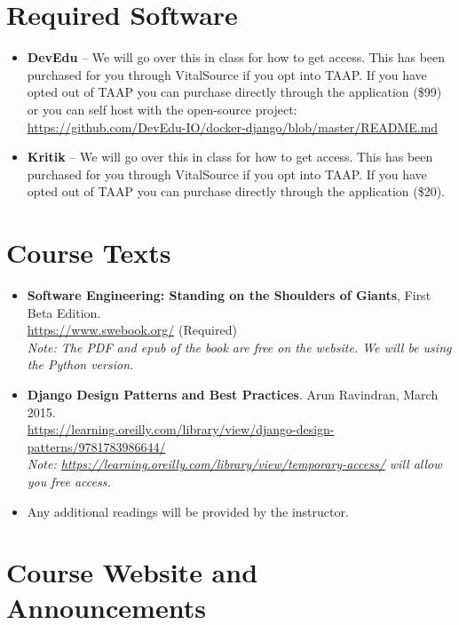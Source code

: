 \documentclass[11pt]{article}
\begin{document}
\section*{Required Software}

\begin{itemize}
    \item \textbf{DevEdu} -- We will go over this in class for how to get access. This has been purchased for you through VitalSource if you opt into TAAP. If you have opted out of TAAP you can purchase directly through the application (\$99) or you can self host with the open-source project: \url{https://github.com/DevEdu-IO/docker-django/blob/master/README.md}
\end{itemize}

\begin{itemize}
    \item \textbf{Kritik} -- We will go over this in class for how to get access. This has been purchased for you through VitalSource if you opt into TAAP. If you have opted out of TAAP you can purchase directly through the application (\$20).
\end{itemize}

\section*{Course Texts}

\begin{itemize}
    \item \textbf{Software Engineering: Standing on the Shoulders of Giants}, First Beta Edition.\\
    \url{https://www.swebook.org/} (Required)\\
    \textit{Note: The PDF and epub of the book are free on the website. We will be using the Python version.}
   
    \item \textbf{Django Design Patterns and Best Practices}. Arun Ravindran, March 2015.\\
    \url{https://learning.oreilly.com/library/view/django-design-patterns/9781783986644/}\\
    \textit{Note: \url{https://learning.oreilly.com/library/view/temporary-access/} will allow you free access.}
    
    \item Any additional readings will be provided by the instructor.
\end{itemize}

\section*{Course Website and Announcements}
\end{document}
